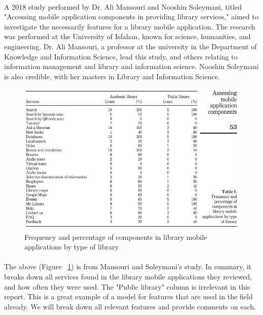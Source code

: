     \paragraph{}
    A 2018 study performed by Dr. Ali Mansouri and Nooshin Soleymani, titled "Accessing mobile application components in providing library services," aimed to investigate the necessarily features for a library mobile application. The research was performed at the University of Isfahan, known for science, humanities, and engineering. Dr. Ali Mansouri, a professor at the university in the Department of Knowledge and Information Science, lead this study, and others relating to information management and library and information science. Nooshin Soleymani is also credible, with her masters in Library and Information Science.
    \begin{figure}[H]
        \centering
        \includegraphics[width = \textwidth, height = \textheight, keepaspectratio]{assets/img/accessing_mobile_application_components_table_1.png}
        \caption{Frequency and percentage of components in library mobile applications by type of library \protect{}}
        \label{fig:freq_and_per_comp_lib_mob_app}
    \end{figure}
    \paragraph{}
    The above (Figure ~\ref{fig:freq_and_per_comp_lib_mob_app}) is from Mansouri and Soleymani's study. In summary, it breaks down all services found in the library mobile applications they reviewed, and how often they were used. The "Public library" column is irrelevant in this report. This is a great example of a model for features that are used in the field already. We will break down all relevant features and provide comments on each.
